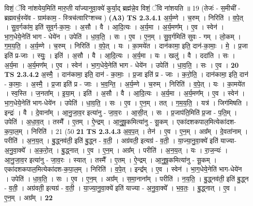 \documentclass[17pt]{extarticle}
\begin{document}
                  \newline
                      विशं॒ ॅवि ना॑शयेय॒मिति॑ मारु॒ती या᳚ज्यानुवा॒क्ये॑ कुर्या॒द् ब्रह्म॑न्ने॒व विशं॒ ॅवि ना॑शयति ॥ 19 (तेजः॑ - स॒मीची᳚ - ब्रह्मवर्च॒स्ये॑व - ग्राम॑काम॒ - स्त्रिच॑त्वारिꣳशच्च )  \textbf{(A3)} \newline \newline
                                \textbf{ TS 2.3.4.1} \newline
                  अ॒र्य॒म्णे । च॒रुम् । निरिति॑ । व॒पे॒त् । सु॒व॒र्गका॑म॒ इति॑ सुव॒र्ग-का॒मः॒ । अ॒सौ । वै । आ॒दि॒त्यः । अ॒र्य॒मा । अ॒र्य॒मण᳚म् । ए॒व । स्वेन॑ । भा॒ग॒धेये॒नेति॑ भाग - धेये॑न । उपेति॑ । धा॒व॒ति॒ । सः । ए॒व । ए॒न॒म् । सु॒व॒र्गमिति॑ सुवः - गम् । लो॒कम् । ग॒म॒य॒ति॒ । अ॒र्य॒म्णे । च॒रुम् । निरिति॑ । व॒पे॒त् । यः । का॒मये॑त । दान॑कामा॒ इति॒ दान॑-का॒माः॒ । मे॒ । प्र॒जा इति॑ प्र-जाः । स्युः॒ । इति॑ । अ॒सौ । वै । आ॒दि॒त्यः । अ॒र्य॒मा । यः । खलु॑ । वै । ददा॑ति । सः । अ॒र्य॒मा । अ॒र्य॒मण᳚म् । ए॒व । स्वेन॑ । भा॒ग॒धेये॒नेति॑ भाग - धेये॑न । उपेति॑ । धा॒व॒ति॒ । सः । ए॒व । \textbf{  20} \newline
                  \newline
                                \textbf{ TS 2.3.4.2} \newline
                  अ॒स्मै॒ । दान॑कामा॒ इति॒ दान॑ - का॒माः॒ । प्र॒जा इति॑ प्र - जाः । क॒रो॒ति॒ । दान॑कामा॒ इति॒ दान॑ - का॒माः॒ । अ॒स्मै॒ । प्र॒जा इति॑ प्र - जाः । भ॒व॒न्ति॒ । अ॒र्य॒म्णे । च॒रुम् । निरिति॑ । व॒पे॒त् । यः । का॒मये॑त । स्व॒स्ति । ज॒नता᳚म् । इ॒या॒म् । इति॑ । अ॒सौ । वै । आ॒दि॒त्यः । अ॒र्य॒मा । अ॒र्य॒मण᳚म् । ए॒व । स्वेन॑ । भा॒ग॒धेये॒नेति॑ भाग-धेये॑न । उपेति॑ । धा॒व॒ति॒ । सः । ए॒व । ए॒न॒म् । तत् । ग॒म॒य॒ति॒ । यत्र॑ । जिग॑मिषति । इन्द्रः॑ । वै । दे॒वाना᳚म् । आ॒नु॒जा॒व॒र इत्या॑नु - जा॒व॒रः । आ॒सी॒त् । सः । प्र॒जाप॑ति॒मिति॑ प्र॒जा - प॒ति॒म् । उपेति॑ । अ॒धा॒व॒त् । तस्मै᳚ । ए॒तम् । ऐ॒न्द्रम् । आ॒नु॒षू॒कमित्या॑नु - सू॒कम् । एका॑दशकपाल॒मित्येका॑दश-क॒पा॒ल॒म् । निरिति॑ । 21 (50 \textbf{  21} \newline
                  \newline
                                \textbf{ TS 2.3.4.3} \newline
                  अ॒व॒प॒त् । तेन॑ । ए॒व । ए॒न॒म् । अग्र᳚म् । दे॒वता॑नाम् । परीति॑ । अ॒न॒य॒त् । बु॒द्ध्नव॑ती॒ इति॑ बु॒द्ध्न - व॒ती॒ । अग्र॑वती॒ इत्यग्र॑ - व॒ती॒ । या॒ज्या॒नु॒वा॒क्ये॑ इति॑ याज्या-अ॒नु॒वा॒क्ये᳚ । अ॒क॒रो॒त् । बु॒द्ध्नात् । ए॒व । ए॒न॒म् । अग्र᳚म् । परीति॑ । अ॒न॒य॒त् । यः । रा॒ज॒न्यः॑ । आ॒नु॒जा॒व॒र इत्या॑नु - जा॒व॒रः । स्यात् । तस्मै᳚ । ए॒तम् । ऐ॒न्द्रम् । आ॒नु॒षू॒कमित्या॑नु - सू॒कम् । एका॑दशकपाल॒मित्येका॑दश-क॒पा॒ल॒म् । निरिति॑ । व॒पे॒त् । इन्द्र᳚म् । ए॒व । स्वेन॑ । भा॒ग॒धेये॒नेति॑ भाग-धेये॑न । उपेति॑ । धा॒व॒ति॒ । सः । ए॒व । ए॒न॒म् । अग्र᳚म् । स॒मा॒नाना᳚म् । परीति॑ । न॒य॒ति॒ । बु॒द्ध्नव॑ती॒ इति॑ बु॒द्ध्न - व॒ती॒ । अग्र॑वती॒ इत्यग्र॑ - व॒ती॒ । या॒ज्या॒नु॒वा॒क्ये॑ इति॑ याज्या - अ॒नु॒वा॒क्ये᳚ । भ॒व॒तः॒ । बु॒द्ध्नात् । ए॒व । ए॒न॒म् । अग्र᳚म् । \textbf{  22} \newline
\end{document}
